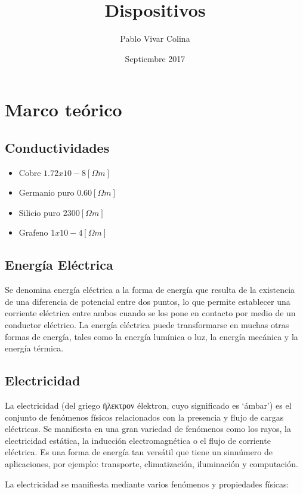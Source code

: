 \documentclass{article}
\title{Dispositivos}
\author{Pablo Vivar Colina}
\date{Septiembre 2017}
\begin{document}
\section{Marco teórico}


\subsection{Conductividades}

\begin{itemize}
    \item Cobre $1.72 x 10-8 [\Omega m]$ \citep{RS}
    \item Germanio puro  $0.60 [\Omega m]$ \citep{RS}
\item Silicio puro $2300 [\Omega m]$ \citep{RS}
\item  Grafeno $1 x 10-4 [\Omega m]$ \citep{Graf}
\end{itemize}


\subsection{Energía Eléctrica}

Se denomina energía eléctrica a la forma de energía que resulta de la existencia de una diferencia de potencial entre dos puntos, lo que permite establecer una corriente eléctrica entre ambos cuando se los pone en contacto por medio de un conductor eléctrico. La energía eléctrica puede transformarse en muchas otras formas de energía, tales como la energía lumínica o luz, la energía mecánica y la energía térmica.\citep{EE}

\subsection{Electricidad}

La electricidad (del griego ήλεκτρον élektron, cuyo significado es ‘ámbar’) es el conjunto de fenómenos físicos relacionados con la presencia y flujo de cargas eléctricas. Se manifiesta en una gran variedad de fenómenos como los rayos, la electricidad estática, la inducción electromagnética o el flujo de corriente eléctrica. Es una forma de energía tan versátil que tiene un sinnúmero de aplicaciones, por ejemplo: transporte, climatización, iluminación y computación.\citep{Elec}

La electricidad se manifiesta mediante varios fenómenos y propiedades físicas:\citep{Elec}
\end{document}
